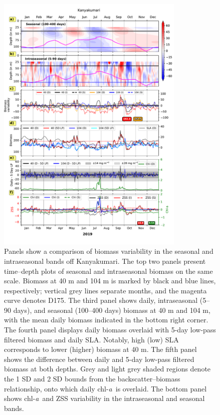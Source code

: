 \documentclass[12pt,a4paper]{article}
\newcommand{\chla}{chl-{\emph{a}}}
\begin{document}
\begin{figure}[htbp]
		\centering
		\includegraphics[width=0.8\textwidth]{./figures/biomass_intra_2019_kanyakumari.pdf} 
		\caption{Panels show a comparison of biomass variability in the seasonal and intraseasonal bands off Kanyakumari. The top two panels present time--depth plots of seasonal and intraseasonal biomass on the same scale. Biomass at 40 m and 104 m is marked by black and blue lines, respectively; vertical grey lines separate months, and the magenta curve denotes D175. The third panel shows daily, intraseasonal (5--90 days), and seasonal (100--400 days) biomass at 40 m and 104 m, with the mean daily biomass indicated in the bottom right corner. The fourth panel displays daily biomass overlaid with 5-day low-pass filtered biomass and daily SLA. Notably, high (low) SLA corresponds to lower (higher) biomass at 40 m. The fifth panel shows the difference between daily and 5-day low-pass filtered biomass at both depths. Grey and light grey shaded regions denote the 1 SD and 2 SD bounds from the backscatter--biomass relationship, onto which daily \chla\ is overlaid. The bottom panel shows \chla\ and ZSS variability in the intraseasonal and seasonal bands.}		
		\label{fig:biomass_intra_2019_kanyakumari}

\end{figure}
\end{document}
